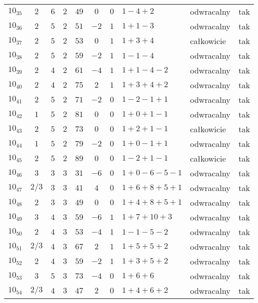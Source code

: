 \begin{longtable}{lccccccllc}
$10_{35}$  & $2$   & $6$ & $2$ & $49$  & $0$  & $0$ & $1-4+2$       & odwracalny & tak \\
$10_{36}$  & $2$   & $5$ & $2$ & $51$  & $-2$ & $1$ & $1+1-3$       & odwracalny & tak \\
$10_{37}$  & $2$   & $5$ & $2$ & $53$  & $0$  & $1$ & $1+3+4$       & całkowicie & tak \\
$10_{38}$  & $2$   & $5$ & $2$ & $59$  & $-2$ & $1$ & $1-1-4$       & odwracalny & tak \\
$10_{39}$  & $2$   & $4$ & $2$ & $61$  & $-4$ & $1$ & $1+1-4-2$     & odwracalny & tak \\
$10_{40}$  & $2$   & $4$ & $2$ & $75$  & $2$  & $1$ & $1+3+4+2$     & odwracalny & tak \\
$10_{41}$  & $2$   & $5$ & $2$ & $71$  & $-2$ & $0$ & $1-2-1+1$     & odwracalny & tak \\
$10_{42}$  & $1$   & $5$ & $2$ & $81$  & $0$  & $0$ & $1+0+1-1$     & odwracalny & tak \\
$10_{43}$  & $2$   & $5$ & $2$ & $73$  & $0$  & $0$ & $1+2+1-1$     & całkowicie & tak \\
$10_{44}$  & $1$   & $5$ & $2$ & $79$  & $-2$ & $0$ & $1+0-1+1$     & odwracalny & tak \\
$10_{45}$  & $2$   & $5$ & $2$ & $89$  & $0$  & $0$ & $1-2+1-1$     & całkowicie & tak \\
$10_{46}$  & $3$   & $3$ & $3$ & $31$  & $-6$ & $0$ & $1+0-6-5-1$   & odwracalny & tak \\
$10_{47}$  & $2/3$ & $3$ & $3$ & $41$  & $4$  & $0$ & $1+6+8+5+1$   & odwracalny & tak \\
$10_{48}$  & $2$   & $3$ & $3$ & $49$  & $0$  & $0$ & $1+4+8+5+1$   & odwracalny & tak \\
$10_{49}$  & $3$   & $4$ & $3$ & $59$  & $-6$ & $1$ & $1+7+10+3$    & odwracalny & tak \\
$10_{50}$  & $2$   & $4$ & $3$ & $53$  & $-4$ & $1$ & $1-1-5-2$     & odwracalny & tak \\
$10_{51}$  & $2/3$ & $4$ & $3$ & $67$  & $2$  & $1$ & $1+5+5+2$     & odwracalny & tak \\
$10_{52}$  & $2$   & $4$ & $3$ & $59$  & $-2$ & $1$ & $1+3+5+2$     & odwracalny & tak \\
$10_{53}$  & $3$   & $5$ & $3$ & $73$  & $-4$ & $0$ & $1+6+6$       & odwracalny & tak \\
$10_{54}$  & $2/3$ & $4$ & $3$ & $47$  & $2$  & $0$ & $1+4+6+2$     & odwracalny & tak \\

\end{longtable}

